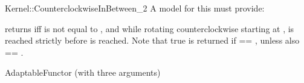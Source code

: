 \begin{ccRefFunctionObjectConcept}{Kernel::CounterclockwiseInBetween_2}
A model for this must provide:


{returns  iff  is not equal to , and 
        while rotating counterclockwise starting at , 
         is reached strictly before  is reached.
        Note that true is returned if  == , unless
        also  == .}

\ccRefines
AdaptableFunctor (with three arguments)

\ccSeeAlso
{}\\

\end{ccRefFunctionObjectConcept}
